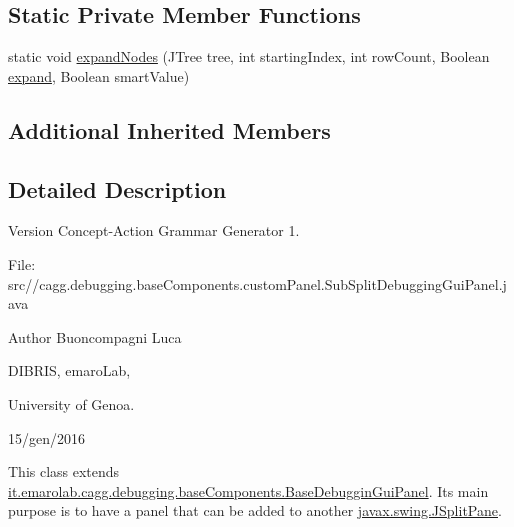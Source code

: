 \subsection*{Static Private Member Functions}
\begin{DoxyCompactItemize}
\item 
static void \hyperlink{classit_1_1emarolab_1_1cagg_1_1debugging_1_1baseComponents_1_1customPanel_1_1SubSplitDebuggingGuiPanel_a80464e639fe674b8d3588fe23d1b4cd3}{expand\-Nodes} (J\-Tree tree, int starting\-Index, int row\-Count, Boolean \hyperlink{classit_1_1emarolab_1_1cagg_1_1debugging_1_1baseComponents_1_1BaseDebugginGuiPanel_a73c0cec164dbf05a9ec5ae33baa99b57}{expand}, Boolean smart\-Value)
\end{DoxyCompactItemize}
\subsection*{Additional Inherited Members}


\subsection{Detailed Description}
\begin{DoxyVersion}{Version}
Concept-\/\-Action Grammar Generator 1. \par
 File\-: src//cagg.debugging.\-base\-Components.\-custom\-Panel.\-Sub\-Split\-Debugging\-Gui\-Panel.\-java \par

\end{DoxyVersion}
\begin{DoxyAuthor}{Author}
Buoncompagni Luca \par
 D\-I\-B\-R\-I\-S, emaro\-Lab,\par
 University of Genoa. \par
 15/gen/2016 \par

\end{DoxyAuthor}


This class extends \hyperlink{classit_1_1emarolab_1_1cagg_1_1debugging_1_1baseComponents_1_1BaseDebugginGuiPanel}{it.\-emarolab.\-cagg.\-debugging.\-base\-Components.\-Base\-Debuggin\-Gui\-Panel}. Its main purpose is to have a panel that can be added to another \hyperlink{}{javax.\-swing.\-J\-Split\-Pane}. 

